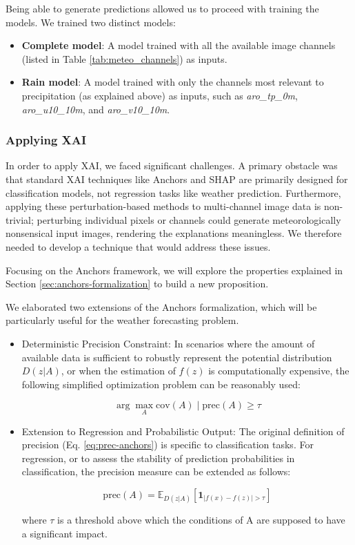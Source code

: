 Being able to generate predictions allowed us to proceed with training the models. We trained two distinct models:
\begin{itemize}
	\item \textbf{Complete model}: A model trained with all the available image channels (listed in Table \ref{tab:meteo_channels}) as inputs.
	\item \textbf{Rain model}: A model trained with only the channels most relevant to precipitation (as explained above) as inputs, such as \textit{aro\_tp\_0m}, \textit{aro\_u10\_10m}, and \textit{aro\_v10\_10m}.
\end{itemize} 

\subsubsection{Applying XAI}
In order to apply XAI, we faced significant challenges. A primary obstacle was that standard XAI techniques like Anchors and SHAP are primarily designed for classification models, not regression tasks like weather prediction. Furthermore, applying these perturbation-based methods to multi-channel image data is non-trivial; perturbing individual pixels or channels could generate meteorologically nonsensical input images, rendering the explanations meaningless. We therefore needed to develop a technique that would address these issues.

Focusing on the Anchors framework, we will explore the properties explained in Section \ref{sec:anchors-formalization} to build a new proposition.

We elaborated two extensions of the Anchors formalization, which will be particularly useful for the weather forecasting problem.

\begin{itemize}
	\item Deterministic Precision Constraint: In scenarios where the amount of available data is sufficient to robustly represent the potential distribution $D(z|A)$, or when the estimation of $f(z)$ is computationally expensive, the following simplified optimization problem can be reasonably used:

	\begin{equation}
		\arg \max_{A} {\text{cov}(A) \mid \text{prec}(A) \geq \tau }
		\label{eq:extended-max-cov-anchors}
	\end{equation}

	\item Extension to Regression and Probabilistic Output: The original definition of precision (Eq. \ref{eq:prec-anchors}) is specific to classification tasks. For regression, or to assess the stability of prediction probabilities in classification, the precision measure can be extended as follows:
	
	\begin{equation}
		\text{prec}(A) = \mathbb{E}_{D(z|A)} [\mathbf{1}_{|f(x) - f(z)| > \tau}]
		\label{eq:extended-prec-anchors}
	\end{equation}

	where $\tau$ is a threshold above which the conditions of A are supposed to have a significant impact.
\end{itemize}

